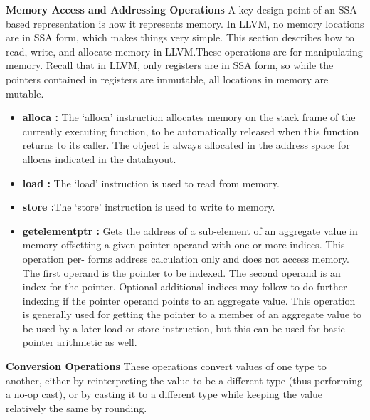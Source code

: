\documentclass[openany]{book}
\begin{document}
	\textbf{Memory Access and Addressing Operations} \newline \newline
	A key design point of an SSA-based representation is how it represents memory. In LLVM, no memory locations are in SSA form, which makes things very simple. This section describes how to read, write, and allocate memory in LLVM.These operations are for manipulating memory.  Recall that in LLVM, only registers are
	in SSA form, so while the pointers contained in registers are immutable, all locations in	memory are mutable.
	
	\begin{itemize}
		\item \textbf{alloca : }The `alloca' instruction allocates memory on the stack frame of the currently executing function, to be automatically released when this function returns to its caller. The object is always allocated in the address space for allocas indicated in the datalayout.
		\item \textbf{load : }The `load' instruction is used to read from memory.
		\item \textbf{store :}The `store' instruction is used to write to memory.
		\item \textbf{getelementptr : }Gets the address of a sub-element of an aggregate value in memory offsetting a given pointer operand with one or more indices. This operation per-
		forms address calculation only and does not access memory. The first operand is the pointer to be indexed.  The second operand is an index for the pointer.  Optional additional indices may follow to do further indexing if the pointer operand points to an aggregate value. This operation is generally used for getting the pointer to a member	of an aggregate value to be used by a later load or store instruction, but this can be
		used for basic pointer arithmetic as well.
	\end{itemize}

	\textbf{Conversion Operations} \newline \newline
	These operations convert values of one type to another, either by reinterpreting the value to	be a different type (thus performing a no-op cast), or by casting it to a different type while
	keeping the value relatively the same by rounding.
	
\end{document}
